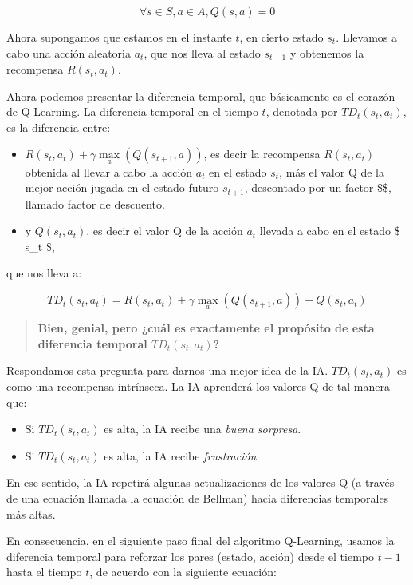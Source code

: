 \documentclass[]{book}
\providecommand{\tightlist}{%
  \setlength{\itemsep}{0pt}\setlength{\parskip}{0pt}}
\begin{document}
\[\forall s \in S, a \in A, Q(s,a) = 0\]

Ahora supongamos que estamos en el instante \(t\), en cierto estado \(s_t\). Llevamos a cabo una acción aleatoria \(a_t\), que nos lleva al estado \(s_{t + 1}\) y obtenemos la recompensa \(R(s_t, a_t)\).

Ahora podemos presentar la diferencia temporal, que básicamente es el corazón de Q-Learning. La diferencia temporal en el tiempo \(t\), denotada por \(TD_t(s_t, a_t)\), es la diferencia entre:

\begin{itemize}
\item
  \(R(s_t,a_t) + \gamma \underset{a}{\max}(Q(s_{t+1},a))\), es decir la recompensa \(R (s_t, a_t)\) obtenida al llevar a cabo la acción \(a_t\) en el estado \(s_t\), más el valor Q de la mejor acción jugada en el estado futuro \(s_{t + 1}\), descontado por un factor \$\gamma \in [0,1] \$, llamado factor de descuento.
\item
  y \(Q(s_t, a_t)\), es decir el valor Q de la acción \(a_t\) llevada a cabo en el estado \$ s\_t \$,
\end{itemize}

que nos lleva a:

\[TD_t(s_t,a_t) = R(s_t,a_t) + \gamma \underset{a}{\max}(Q(s_{t+1},a)) - Q(s_t,a_t)\]

\begin{quote}
\textbf{Bien, genial, pero ¿cuál es exactamente el propósito de esta diferencia temporal \(TD_t(s_t,a_t)\)?}
\end{quote}

Respondamos esta pregunta para darnos una mejor idea de la IA. \(TD_t (s_t, a_t)\) es como una recompensa intrínseca. La IA aprenderá los valores Q de tal manera que:

\begin{itemize}
\tightlist
\item
  Si \(TD_t(s_t,a_t)\) es alta, la IA recibe una \emph{buena sorpresa}.
\item
  Si \(TD_t(s_t,a_t)\) es alta, la IA recibe \emph{frustración}.
\end{itemize}

En ese sentido, la IA repetirá algunas actualizaciones de los valores Q (a través de una ecuación llamada la ecuación de Bellman) hacia diferencias temporales más altas.

En consecuencia, en el siguiente paso final del algoritmo Q-Learning, usamos la diferencia temporal para reforzar los pares (estado, acción) desde el tiempo \(t-1\) hasta el tiempo \(t\), de acuerdo con la siguiente ecuación:
\end{document}
